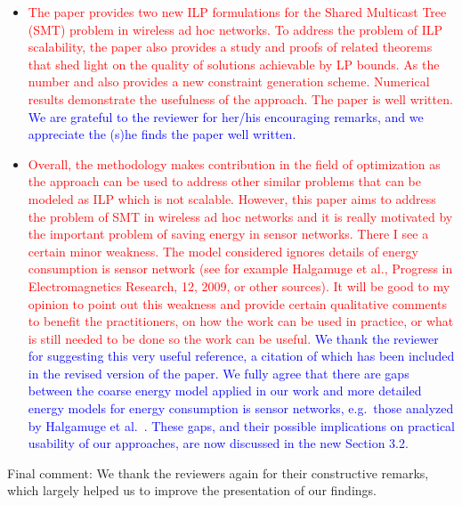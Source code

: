 \documentclass[12pt]{article}
\begin{document}
\begin{itemize}
\item \textcolor{red}{The paper provides two new ILP formulations for the Shared Multicast Tree (SMT) problem in wireless ad hoc networks.
To address the problem of ILP scalability, the paper also provides a study and proofs of related theorems that shed light on the quality of
solutions achievable by  LP  bounds.
As the number and also provides a new constraint generation scheme.
Numerical results demonstrate the usefulness of the approach. The paper is well written.} \textcolor{blue}{
We are grateful to the reviewer for her/his encouraging remarks, and we appreciate the (s)he finds the paper well written.
}
\item \textcolor{red}{Overall, the methodology makes contribution in the field of optimization as the approach can be used to address other similar problems
that can be modeled as ILP which is not scalable.
However, this paper aims to address the problem of SMT in wireless ad hoc networks and it is
really motivated by the important problem of saving energy in sensor networks.
There I see a certain minor weakness.
The model considered ignores details of energy consumption is sensor network
(see for example Halgamuge et al., Progress in Electromagnetics Research, 12, 2009, or other sources).
It will be good to my opinion to point out this weakness and provide certain qualitative comments to benefit the practitioners,
on how the work can be used in practice, or what is still needed to be done so the work can be useful.} \textcolor{blue}{
We thank the reviewer for suggesting this very useful reference, a citation of which has been included in the revised version of the paper.
We fully agree that there are gaps between the coarse energy model applied in our work and more detailed energy models for energy consumption is sensor networks,
e.g.\ those analyzed by Halgamuge et al.\ \cite{halgamuge}.
These gaps, and their possible implications on practical usability of our approaches, are now discussed in the new Section 3.2.
}
\end{itemize}

\noindent
Final comment: We thank the reviewers again for their constructive remarks, which largely helped us to improve the presentation of our findings.
\end{document}
